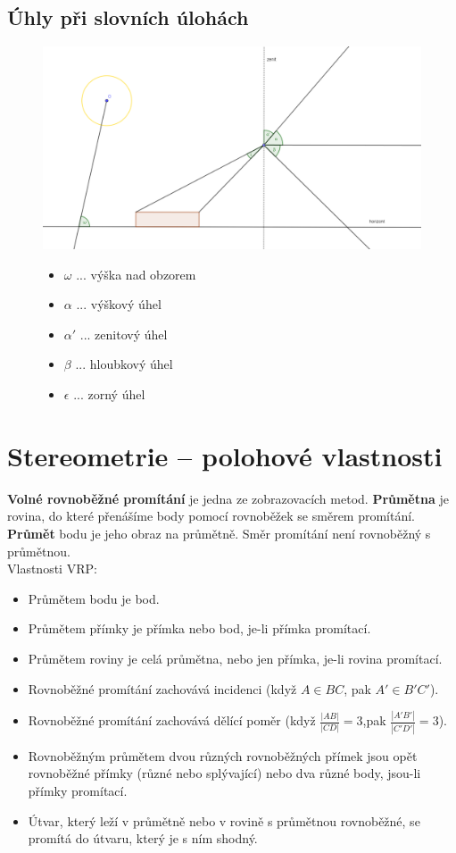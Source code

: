 \documentclass[12pt, a4paper]{article}
\begin{document}
\subsection*{Úhly při slovních úlohách}
\begin{figure}[H]
\centering
\includegraphics[scale=0.3]{vyskovyuhel}
\vspace{2cm}
\begin{itemize}
\item $\omega$ ... výška nad obzorem
\item $\alpha$ ... výškový úhel
\item $\alpha'$ ... zenitový úhel
\item $\beta$ ... hloubkový úhel
\item $\epsilon$ ... zorný úhel
\end{itemize}
\end{figure} 

\section{Stereometrie – polohové vlastnosti}
\textbf{Volné rovnoběžné promítání} je jedna ze zobrazovacích metod. \textbf{Průmětna} je rovina, do které přenášíme body pomocí rovnoběžek se směrem promítání. \textbf{Průmět} bodu je jeho obraz na průmětně. Směr promítání není rovnoběžný s průmětnou.\\
Vlastnosti VRP:
\begin{itemize}
\item Průmětem bodu je bod.
\item Průmětem přímky je přímka nebo bod, je-li přímka promítací.
\item Průmětem roviny je celá průmětna, nebo jen přímka, je-li rovina promítací.
\item Rovnoběžné promítání zachovává incidenci (když $A \in BC$, pak $A' \in B'C'$).
\item Rovnoběžné promítání zachovává dělící poměr (když $\frac{|AB|}{|CD|}=3$,pak $\frac{|A'B'|}{|C'D'|}=3$).
\item Rovnoběžným průmětem dvou různých rovnoběžných přímek jsou opět rovnoběžné přímky (různé nebo splývající) nebo dva různé body, jsou-li přímky promítací.
\item Útvar, který leží v průmětně nebo v rovině s průmětnou rovnoběžné, se promítá do útvaru, který je s ním shodný.
\end{itemize}
\end{document}
